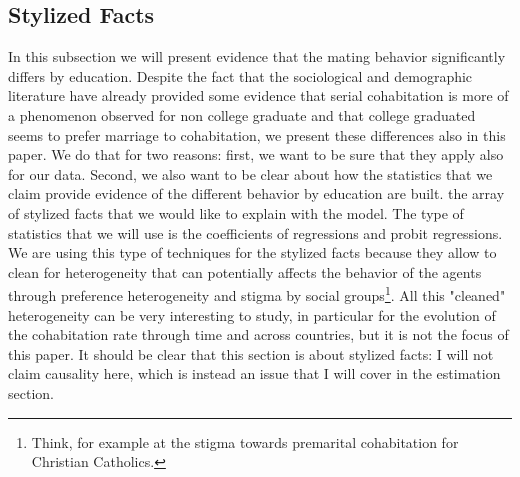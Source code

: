 \documentclass[12pt]{article}
\begin{document}
\subsection{Stylized Facts}
In this subsection we will present evidence that the mating behavior significantly differs by education. Despite the fact that the sociological and demographic literature have already provided some evidence that serial cohabitation is more of a phenomenon observed for non college graduate and that college graduated seems to prefer marriage to cohabitation, we present these differences also in this paper. We do that for two reasons: first, we want to be sure that they apply also for our data. Second, we also want to be clear about how the statistics that we claim provide evidence of the different behavior by education are built.  the array of stylized facts that we would like to explain with the model. The type of statistics that we will use is the coefficients of regressions and probit regressions. We are using this type of techniques for the stylized facts because they allow to clean for heterogeneity that can potentially affects the behavior of the agents through preference heterogeneity and stigma by social groups\footnote{Think, for example at the stigma towards premarital cohabitation for Christian Catholics.}. All this "cleaned" heterogeneity can be very interesting to study, in particular for the evolution of the cohabitation rate through time and across countries, but it is not the focus of this paper. It should be clear that this section is about stylized facts: I will not claim causality here, which is instead an issue that I will cover in the estimation section. \\
\end{document}
